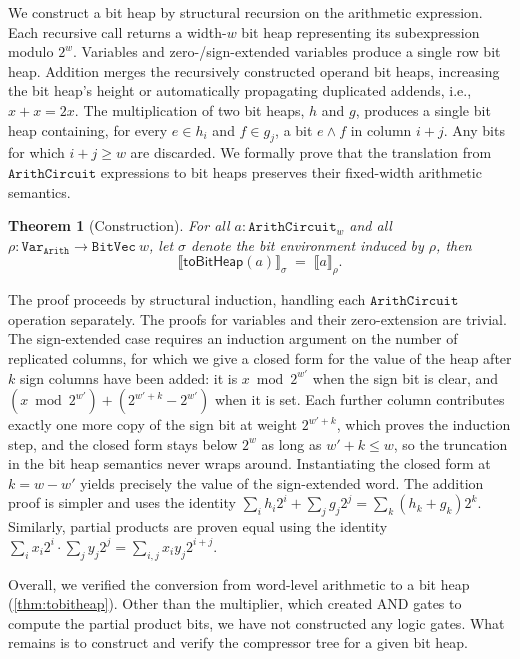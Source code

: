 \documentclass[conference]{IEEEtran}
\newcommand{\bvsem}[1]{\llbracket #1 \rrbracket_{\rho}}
\newcommand{\hsem}[1]{\llbracket #1 \rrbracket_{\sigma}}
\newcommand{\Arith}{\ensuremath{\texttt{ArithCircuit}}\xspace}
\theoremstyle{plain}
\newtheorem{theorem}{Theorem}
\theoremstyle{definition}
\begin{document}
We construct a bit heap by structural recursion on the arithmetic expression. 
Each recursive call returns a width-$w$ bit heap representing its subexpression modulo $2^w$.
Variables and zero-/sign-extended variables produce a single row bit heap.
Addition merges the recursively constructed operand bit heaps, increasing the bit heap's height or automatically propagating duplicated addends, i.e., $x+x = 2x$.
The multiplication of two bit heaps, $h$ and $g$, produces a single bit heap containing, for every $e \in h_i$ and $f \in g_j$, a bit $e \land f$ in column $i+j$. Any bits for which $i+j\geq w$ are discarded.
We formally prove that the translation from \Arith expressions to bit heaps preserves their fixed-width arithmetic semantics.

\begin{theorem}[Construction]\label{thm:tobitheap}
For all $a : \mathtt{ArithCircuit}_w$ and all $\rho : \texttt{Var}_{\texttt{Arith}}\to
\mathtt{BitVec}\ w$, let $\sigma$ denote the bit environment induced
by $\rho$, then
\[
  \hsem{\mathsf{toBitHeap}(a)} \;=\; \bvsem{a}.
\]
\end{theorem}

The proof proceeds by structural induction, handling each \Arith operation separately. 
The proofs for variables and their zero-extension are trivial. 
The sign-extended case requires an induction argument on the number of replicated columns,
for which we give a closed form for the value of the heap after $k$ sign columns have been added:
it is $x \bmod 2^{w'}$ when the sign bit is clear, and $(x \bmod 2^{w'}) + (2^{w'+k} - 2^{w'})$ when it is set.
Each further column contributes exactly one more copy of the sign bit at weight $2^{w'+k}$, which proves the induction step,
and the closed form stays below $2^{w}$ as long as $w' + k \leq w$, so the truncation in the bit heap semantics never wraps around.
Instantiating the closed form at $k = w - w'$ yields precisely the value of the sign-extended word.
The addition proof is simpler and uses the identity $\sum_i h_i 2^i + \sum_j  g_j 2^j = \sum_k (h_k + g_k) 2^k$.
Similarly, partial products are proven equal using the identity $\sum_i x_i 2^i \cdot \sum_j y_j 2^j = \sum_{i,j} x_i y_j 2^{i+j}$.

Overall, we verified the conversion from word-level arithmetic to a bit heap (\autoref{thm:tobitheap}).
Other than the multiplier, which created AND gates to compute the partial product bits, 
we have not constructed any logic gates.
What remains is to construct and verify the compressor tree for a given bit heap.
\end{document}

